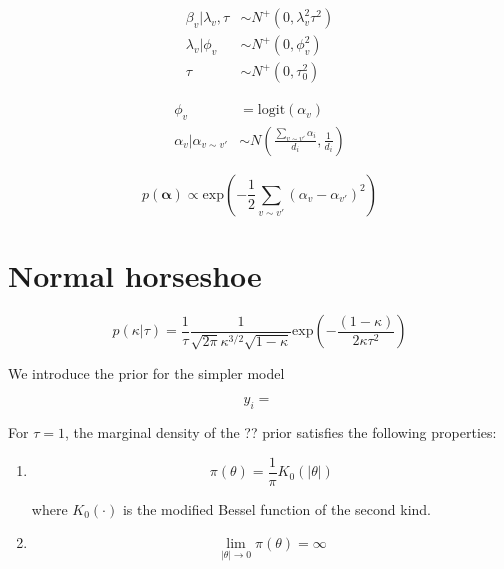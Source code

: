 \begin{equation}
  \begin{aligned}
    \beta_v | \lambda_v, \tau &\sim N^+(0, \lambda_v^2 \tau^2) \\
    \lambda_v | \phi_v &\sim N^+(0, \phi_v^2) \\
    \tau &\sim N^+(0, \tau_0^2)
    \end{aligned}
  \label{eq:hs_prior}
\end{equation}



\begin{equation}
  \begin{aligned}
    \phi_v &= \text{logit} (\alpha_v) \\
    \alpha_v | \alpha_{v \sim v'} &\sim
            N\left(\frac{\sum_{v \sim v'} \alpha_i}{d_i},
                   \frac{1}{d_i}\right)
  \end{aligned}
  \label{eq:icar1}
\end{equation}

\begin{equation}
  p(\boldsymbol{\alpha}) \propto \text{exp} \left(-\frac{1}{2} \sum _{v \sim v'}
      (\alpha_v - \alpha_{v'})^2 \right)
  \label{eq:icar1}
\end{equation}




\section*{Normal horseshoe}

\[
 p(\kappa | \tau) = \frac{1}{\tau} \frac{1}{\sqrt{2 \pi} \kappa^{3/2} \sqrt{1 - \kappa}}
 \text{exp} \left(-\frac{(1-\kappa)}{2 \kappa \tau^2} \right)
\]



We introduce the prior for the simpler model 

\[
  y_i = \
\]

\begin{theorem}
For $\tau = 1$, the marginal density of the ?? prior satisfies the following
properties:

\begin{enumerate}
\item
\[
  \pi (\theta) = \frac{1}{\pi}K_0(|\theta|)
\]

where $K_0(\cdot)$ is the modified Bessel function of the second kind.

\item
\[
     \lim_{|\theta| \to 0} \pi (\theta) = \infty
\]
\end{enumerate}
\end{theorem}

